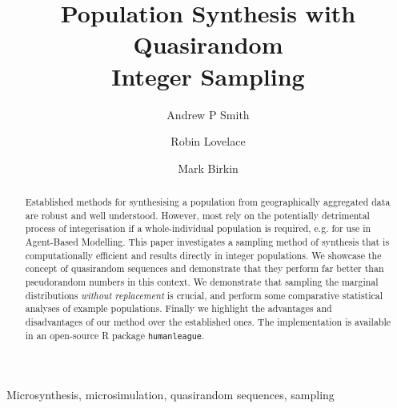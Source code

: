 \documentclass{JASSS}
\title{Population Synthesis with Quasirandom \\Integer Sampling}
\author[1]{Andrew P Smith}
\author[1]{Robin Lovelace}
\author[1]{Mark Birkin}
\affil[1]{University of Leeds}
\begin{document}
\maketitle 



\begin{abstract}
Established methods for synthesising a population from geographically
aggregated data are robust and well understood. However, most rely on
the potentially detrimental process of integerisation if a
whole-individual population is required, e.g. for use in Agent-Based
Modelling. This paper investigates a sampling method of synthesis that
is computationally efficient and results directly in integer
populations. We showcase the concept of quasirandom sequences and
demonstrate that they perform far better than pseudorandom numbers in
this context. We demonstrate that sampling the marginal distributions
\emph{without replacement} is crucial, and perform some comparative
statistical analyses of example populations. Finally we highlight the
advantages and disadvantages of our method over the established ones.
The implementation is available in an open-source R package
\texttt{humanleague}.
\end{abstract}

\begin{keywords}
Microsynthesis, microsimulation, quasirandom sequences, sampling
\end{keywords}

\parano{}



\end{document}
